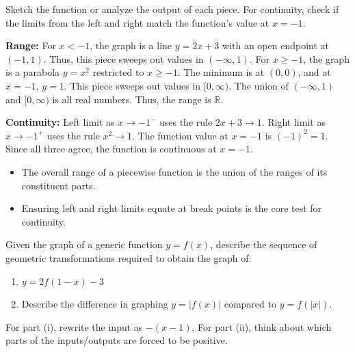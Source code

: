 \begin{hint}
Sketch the function or analyze the output of each piece. For continuity, check if the limits from the left and right match the function's value at $x=-1$.
\end{hint}

\begin{solution}
\textbf{Range:} 
For $x < -1$, the graph is a line $y = 2x+3$ with an open endpoint at $(-1, 1)$. Thus, this piece sweeps out values in $(-\infty, 1)$.
For $x \ge -1$, the graph is a parabola $y = x^2$ restricted to $x \ge -1$. The minimum is at $(0,0)$, and at $x=-1$, $y=1$. This piece sweeps out values in $[0, \infty)$.
The union of $(-\infty, 1)$ and $[0, \infty)$ is all real numbers. Thus, the range is $\boxed{\mathbb{R}}$. 

\textbf{Continuity:}
Left limit as $x \to -1^-$ uses the rule $2x+3 \to 1$.
Right limit as $x \to -1^+$ uses the rule $x^2 \to 1$.
The function value at $x=-1$ is $(-1)^2 = 1$.
Since all three agree, the function is $\boxed{\text{continuous}}$ at $x=-1$.
\end{solution}

\begin{takeaways}
\begin{itemize}[leftmargin=*]
\item The overall range of a piecewise function is the union of the ranges of its constituent parts.
\item Ensuring left and right limits equate at break points is the core test for continuity.
\end{itemize}
\end{takeaways}

\begin{problem}
Given the graph of a generic function $y = f(x)$, describe the sequence of geometric transformations required to obtain the graph of:
\begin{enumerate}[label=(\roman*)]
\item $y = 2f(1-x) - 3$
\item Describe the difference in graphing $y = |f(x)|$ compared to $y = f(|x|)$.
\end{enumerate}
\end{problem}

\begin{hint}
For part (i), rewrite the input as $-(x-1)$. For part (ii), think about which parts of the inputs/outputs are forced to be positive.
\end{hint}

